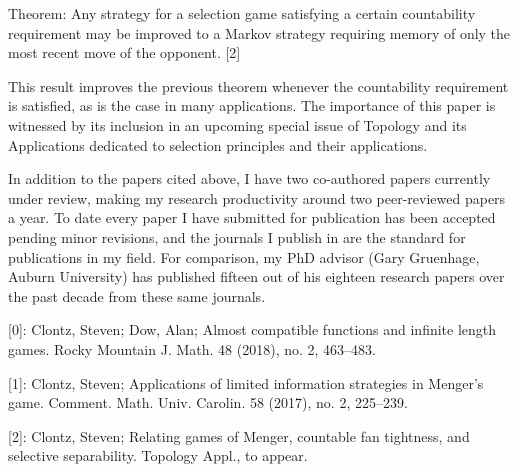 \documentclass[11pt]{amsart}
\theoremstyle{plain}
\newcommand{\<}{\langle}
\renewcommand{\>}{\rangle}
\begin{document}
Theorem: Any strategy for a selection game satisfying a
certain countability requirement may be improved to a Markov strategy requiring
memory of only the most recent move of the opponent. [2] 

This result improves the previous theorem whenever the countability requirement
is satisfied, as is the case in many applications. The importance of this
paper is witnessed by its inclusion in an upcoming special issue of Topology
and its Applications dedicated to selection principles and their applications.

In addition to the papers cited above, I have two co-authored papers
currently under review, making my research productivity around two peer-reviewed
papers a year. 
To date every paper I have submitted for publication has been accepted
pending minor revisions, and the journals I publish in are the standard for publications
in my field. For comparison, my PhD advisor (Gary Gruenhage, Auburn University)
has published fifteen out of his eighteen research papers over the past decade
from these same journals. 

[0]: Clontz, Steven; Dow, Alan;
Almost compatible functions and infinite length games.
Rocky Mountain J. Math. 48 (2018), no. 2, 463–483.   

[1]: Clontz, Steven;
Applications of limited information strategies in Menger's game. 
Comment. Math. Univ. Carolin. 58 (2017), no. 2, 225–239. 

[2]: Clontz, Steven;
Relating games of Menger, countable fan tightness, and selective separability.
Topology Appl., to appear.

%
%
\end{document}
